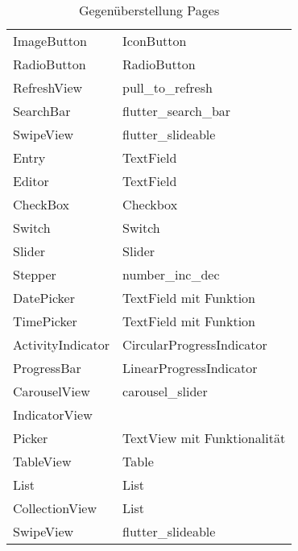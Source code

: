 \begin{table}
\begin{tabularx}{\textwidth}{X|X}
	ImageButton		       			&  	IconButton 		\\ 
	RadioButton		       			&  	RadioButton 		\\ 
	RefreshView		       			&  	pull\_to\_refresh 		\\ 
	SearchBar		       				&  	flutter\_search\_bar 	\\ 
	SwipeView		       			&  	flutter\_slideable 		\\ 
	Entry		       						&  TextField	 		\\ 
	Editor		       					&  TextField	 		\\ 
	CheckBox		       				&  Checkbox	 		\\ 
	Switch		       					&  Switch	 		\\ 
	Slider		       					&  Slider	 		\\ 
	Stepper		       				&  number\_inc\_dec	 		\\ 
	DatePicker		       			&  TextField mit Funktion		\\ 
	TimePicker		       			&  TextField mit Funktion	 		\\ 
	ActivityIndicator		       	&  	CircularProgressIndicator 		\\ 
	ProgressBar		       			&  	LinearProgressIndicator 		\\ 
	CarouselView		       		&  	carousel\_slider  		\\ 
	IndicatorView		       		&  			\\ 	
	Picker		       					&  	TextView mit Funktionalität 		\\ 
	TableView		       				&  	Table		\\ 
	List		       						&  	List 		\\ 
	CollectionView		       		&  	List 		\\ 
	SwipeView		       			&  	flutter\_slideable 		\\ 	
	
\end{tabularx}
\caption{Gegenüberstellung Pages}
 \label{tab:ComapreXFFlutter}
\end{table}